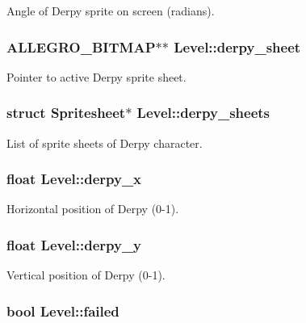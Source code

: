 Angle of Derpy sprite on screen (radians). \hypertarget{structLevel_a0e02f3a5674a2ad3c23de22b6a4ed044}{
\subsubsection[{derpy\-\_\-sheet}]{\setlength{\rightskip}{0pt plus 5cm}A\-L\-L\-E\-G\-R\-O\-\_\-\-B\-I\-T\-M\-A\-P$\ast$$\ast$ Level\-::derpy\-\_\-sheet}}\label{structLevel_a0e02f3a5674a2ad3c23de22b6a4ed044}
Pointer to active Derpy sprite sheet. \hypertarget{structLevel_aad19c0af5ac43ceb72df311d89bd4297}{
\subsubsection[{derpy\-\_\-sheets}]{\setlength{\rightskip}{0pt plus 5cm}struct {\bf Spritesheet}$\ast$ Level\-::derpy\-\_\-sheets}}\label{structLevel_aad19c0af5ac43ceb72df311d89bd4297}
List of sprite sheets of Derpy character. \hypertarget{structLevel_ae5a97d5b61c70c63e93992a9ff3935f9}{
\subsubsection[{derpy\-\_\-x}]{\setlength{\rightskip}{0pt plus 5cm}float Level\-::derpy\-\_\-x}}\label{structLevel_ae5a97d5b61c70c63e93992a9ff3935f9}
Horizontal position of Derpy (0-\/1). \hypertarget{structLevel_a7b3c0f5af134797a1ed21ef48da3ab00}{
\subsubsection[{derpy\-\_\-y}]{\setlength{\rightskip}{0pt plus 5cm}float Level\-::derpy\-\_\-y}}\label{structLevel_a7b3c0f5af134797a1ed21ef48da3ab00}
Vertical position of Derpy (0-\/1). \hypertarget{structLevel_a5bea34b31777260f1b23a1d64e6cd865}{
\subsubsection[{failed}]{\setlength{\rightskip}{0pt plus 5cm}bool Level\-::failed}}\label{structLevel_a5bea34b31777260f1b23a1d64e6cd865}
